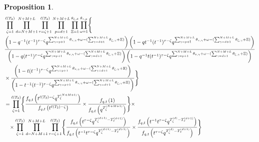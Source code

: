 \documentclass[12pt,reqno,a4paper]{amsart}
\numberwithin{equation}{section}
\newtheorem{prop}[thm]{Proposition}
\theoremstyle{definition}
\begin{document}
\begin{prop}\mbox{}
\label{prpa3-17aug-sun-1329}
\footnotesize
\begin{align}
	&
	\prod_{\zeta = 1}^{\ell(T_2)}
	\prod_{d = N+M+1}^{N+M+L}
	\prod_{\tau = \zeta + 1}^{\ell(T_2)}
	\prod_{p = d+1}^{N+M+L}
	\prod_{\Xi = 1}^{\theta_{\zeta,d}}
	\prod_{\omega = 1}^{\theta_{\tau,p}}
	\Biggl\{
	\\
	&\frac{
		\left(	1 - q^{-1}					
		(t^{-1})^{\tau - \zeta} q^{	\sum_{\gamma = p + 1}^{N + M + L} \theta_{\tau,\gamma}	+ \omega	- (\sum_{\gamma = d + 1}^{N + M + L} \theta_{\zeta,\gamma} + \Xi)		}	
		\right)
		\left(	1 - qt^{-1}			
		(t^{-1})^{\tau - \zeta} q^{	\sum_{\gamma = p + 1}^{N + M + L} \theta_{\tau,\gamma}	+ \omega	- (\sum_{\gamma = d + 1}^{N + M + L} \theta_{\zeta,\gamma} + \Xi)		}
		\right)
	}{
		\left(	1 - q			
		(t^{-1})^{\tau - \zeta} q^{	\sum_{\gamma = p + 1}^{N + M + L} \theta_{\tau,\gamma}	+ \omega	- (\sum_{\gamma = d + 1}^{N + M + L} \theta_{\zeta,\gamma} + \Xi)		}
		\right)
		\left(	1 - q^{-1}t			
		(t^{-1})^{\tau - \zeta} q^{	\sum_{\gamma = p + 1}^{N + M + L} \theta_{\tau,\gamma}	+ \omega	- (\sum_{\gamma = d + 1}^{N + M + L} \theta_{\zeta,\gamma} + \Xi)		}
		\right)
	}
	\notag 
	\\
	&\times
	\frac{
		\left(	1 - t		
		(t^{-1})^{\tau - \zeta} q^{	\sum_{\gamma = p + 1}^{N + M + L} \theta_{\tau,\gamma}	+ \omega	- (\sum_{\gamma = d + 1}^{N + M + L} \theta_{\zeta,\gamma} + \Xi)		}
		\right)
	}{
		\left(	1 - t^{-1}			
		(t^{-1})^{\tau - \zeta} q^{	\sum_{\gamma = p + 1}^{N + M + L} \theta_{\tau,\gamma}	+ \omega	- (\sum_{\gamma = d + 1}^{N + M + L} \theta_{\zeta,\gamma} + \Xi)		}
		\right)
	}
	\Biggr\}
	\notag 
	\\
	&=
	\prod_{\zeta = 1}^{\ell(T_2)}
	\Biggl\{
	\frac{f_{q,t}\left(		t^{\ell(T_2) - \zeta} q^{ T^{(N+M+1)}_{\zeta}		}					\right)}{
		f_{q,t}\left(		t^{\ell(T_2) - \zeta} 					\right)
	}
	\times 
	\frac{
		f_{q,t}\left(	1					\right)
	}{
		f_{q,t}\left(q^{ T^{(N+M+1)}_{\zeta} 		}						\right)
	} 
	\Biggr\}
	\times
	\notag 
	\\
	&\hspace{0.3cm}\times 
	\prod_{\zeta = 1}^{\ell(T_2)}
	\prod_{d = N+M+1}^{N+M+L}
	\prod_{\tau = \zeta + 1}^{\ell(T_2)}
	\Biggl\{
	\frac{
		f_{q,t}\left(	t^{\tau - \zeta} q^{ T^{(d+1)}_{\zeta} 	- T^{(d+1)}_{\tau}	 		}						\right)
	}{
		f_{q,t}\left(		t^{-1}		
		t^{\tau - \zeta} q^{ T^{(d+1)}_{\zeta} 	- T^{(d+1)}_{\tau}			}					\right)
	}
	\times
	\frac{
		f_{q,t}\left(		t^{-1}		
		t^{\tau - \zeta} q^{ T^{(d)}_{\zeta} 	- T^{(d+1)}_{\tau} 		}					\right)
	}{
		f_{q,t}\left(	t^{\tau - \zeta} q^{ T^{(d)}_{\zeta} 	- T^{(d+1)}_{\tau}		}						\right)
	}
	\Biggr\} 
	\notag 
\end{align}
\normalsize
\end{prop}
\end{document}
